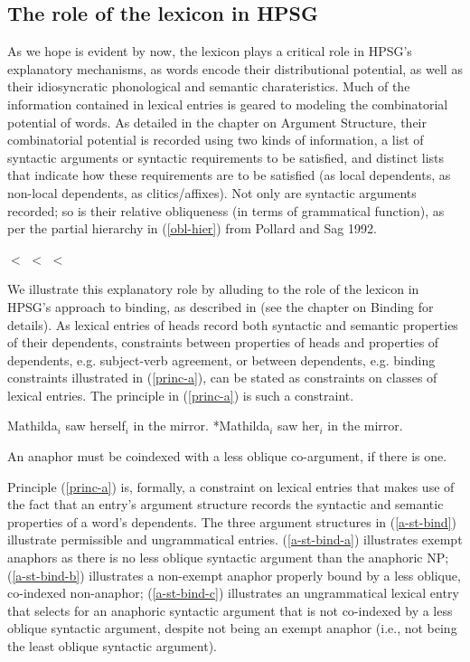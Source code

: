 \documentclass[output=paper]{langsci/langscibook}
\begin{document}
\subsection{The role of the lexicon in HPSG}

As we hope is evident by now, the lexicon plays a critical role in HPSG's explanatory mechanisms, as words encode their distributional potential, as well as their idiosyncratic phonological and semantic charateristics. 
Much of the information contained in lexical entries is geared to modeling the combinatorial potential of words. As detailed in the chapter on Argument Structure, their combinatorial potential is recorded using two kinds of information, 
a list of syntactic arguments or syntactic requirements to be satisfied, and distinct lists that indicate how these requirements are to be satisfied (as local dependents, as non-local dependents, as clitics/affixes).
Not only are syntactic arguments recorded; so is their relative obliqueness (in terms of grammatical function), as per the partial hierarchy in (\ref{obl-hier}) from Pollard and Sag 1992. 

\begin{exe}
	\ex\label{obl-hier}  $<$  $<$  $<$ 
\end{exe}


We illustrate this explanatory role by alluding to the role of the lexicon in HPSG's approach to binding, as described in  (see the chapter on Binding for details). As lexical entries of heads record both syntactic and semantic properties of their dependents, constraints between properties of heads and properties of dependents, e.g. subject-verb agreement, or between dependents, e.g. binding constraints illustrated in (\ref{princ-a}), can be stated as constraints on classes of lexical entries. The principle in (\ref{princ-a}) is such a constraint.

\begin{exe}
	\ex\label{bind}\begin{xlist}
		\ex\label{bind-a} Mathilda$_{i}$ saw herself$_{i}$ in the mirror. 
		\ex\label{bind-b} *Mathilda$_{i}$ saw her$_{i}$ in the mirror. 
	\end{xlist}	
	\ex\label{princ-a}An anaphor must be coindexed with a less oblique co-argument, if there is one.
\end{exe}

Principle (\ref{princ-a}) is, formally, a constraint on lexical entries that makes use of the fact that an entry's argument structure records the syntactic and semantic properties of a word's dependents. The three argument structures in (\ref{a-st-bind}) illustrate permissible and ungrammatical entries. (\ref{a-st-bind-a}) illustrates exempt anaphors as there is no less oblique syntactic argument than the anaphoric NP; (\ref{a-st-bind-b}) illustrates a non-exempt anaphor properly bound by a less oblique, co-indexed non-anaphor; (\ref{a-st-bind-c}) illustrates an ungrammatical lexical entry that selects for an anaphoric syntactic argument that is not co-indexed by a less oblique syntactic argument, despite not being an exempt anaphor (i.e., not being the least oblique syntactic argument).
\end{document}
